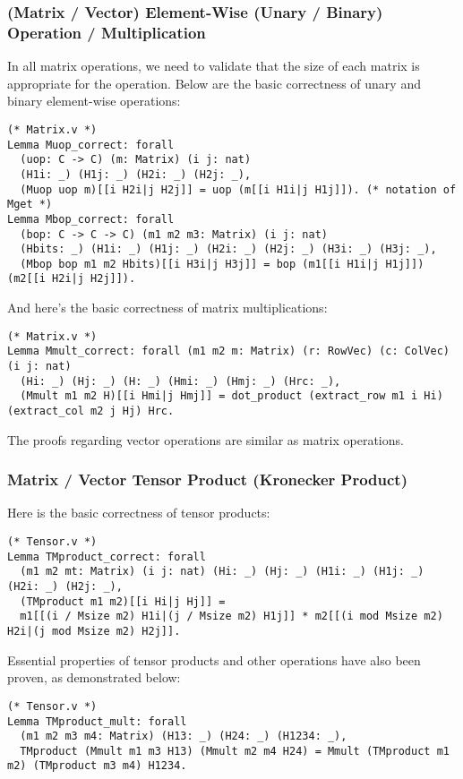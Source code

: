 \documentclass[10pt,a4paper]{article}
\newcommand{\<}{\langle}
\renewcommand{\>}{\rangle}
\begin{document}
\subsubsection{(Matrix / Vector) Element-Wise (Unary / Binary) Operation / Multiplication}

In all matrix operations, we need to validate that the size of each matrix
is appropriate for the operation.
Below are the basic correctness of unary and binary element-wise operations:
\begin{lstlisting}
(* Matrix.v *)
Lemma Muop_correct: forall
  (uop: C -> C) (m: Matrix) (i j: nat)
  (H1i: _) (H1j: _) (H2i: _) (H2j: _),
  (Muop uop m)[[i H2i|j H2j]] = uop (m[[i H1i|j H1j]]). (* notation of Mget *)
Lemma Mbop_correct: forall
  (bop: C -> C -> C) (m1 m2 m3: Matrix) (i j: nat)
  (Hbits: _) (H1i: _) (H1j: _) (H2i: _) (H2j: _) (H3i: _) (H3j: _),
  (Mbop bop m1 m2 Hbits)[[i H3i|j H3j]] = bop (m1[[i H1i|j H1j]]) (m2[[i H2i|j H2j]]).
\end{lstlisting}

And here's the basic correctness of matrix multiplications:
\begin{lstlisting}
(* Matrix.v *)
Lemma Mmult_correct: forall (m1 m2 m: Matrix) (r: RowVec) (c: ColVec) (i j: nat)
  (Hi: _) (Hj: _) (H: _) (Hmi: _) (Hmj: _) (Hrc: _),
  (Mmult m1 m2 H)[[i Hmi|j Hmj]] = dot_product (extract_row m1 i Hi) (extract_col m2 j Hj) Hrc.
\end{lstlisting}

The proofs regarding vector operations are similar as matrix operations.

\subsubsection{Matrix / Vector Tensor Product (Kronecker Product)}

Here is the basic correctness of tensor products:
\begin{lstlisting}
(* Tensor.v *)
Lemma TMproduct_correct: forall
  (m1 m2 mt: Matrix) (i j: nat) (Hi: _) (Hj: _) (H1i: _) (H1j: _) (H2i: _) (H2j: _),
  (TMproduct m1 m2)[[i Hi|j Hj]] =
  m1[[(i / Msize m2) H1i|(j / Msize m2) H1j]] * m2[[(i mod Msize m2) H2i|(j mod Msize m2) H2j]].
\end{lstlisting}

Essential properties of tensor products and other operations have also been
proven, as demonstrated below:

\begin{lstlisting}
(* Tensor.v *)
Lemma TMproduct_mult: forall
  (m1 m2 m3 m4: Matrix) (H13: _) (H24: _) (H1234: _),
  TMproduct (Mmult m1 m3 H13) (Mmult m2 m4 H24) = Mmult (TMproduct m1 m2) (TMproduct m3 m4) H1234.
\end{lstlisting}
\end{document}
